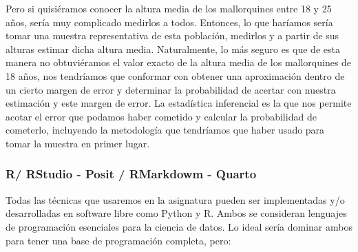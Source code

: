 \documentclass[
  letterpaper,
  DIV=11,
  numbers=noendperiod]{scrreprt}
\begin{document}
Pero si quisiéramos conocer la altura media de los mallorquines entre 18
y 25 años, sería muy complicado medirlos a todos. Entonces, lo que
haríamos sería tomar una muestra representativa de esta población,
medirlos y a partir de sus alturas estimar dicha altura media.
Naturalmente, lo más seguro es que de esta manera no obtuviéramos el
valor exacto de la altura media de los mallorquines de 18 años, nos
tendríamos que conformar con obtener una aproximación dentro de un
cierto margen de error y determinar la probabilidad de acertar con
nuestra estimación y este margen de error. La estadística inferencial es
la que nos permite acotar el error que podamos haber cometido y calcular
la probabilidad de cometerlo, incluyendo la metodología que tendríamos
que haber usado para tomar la muestra en primer lugar.

\hypertarget{r-rstudio---posit-rmarkdowm---quarto}{%
\subsubsection{R/ RStudio - Posit / RMarkdowm -
Quarto}\label{r-rstudio---posit-rmarkdowm---quarto}}

Todas las técnicas que usaremos en la asignatura pueden ser
implementadas y/o desarrolladas en software libre como Python y R. Ambos
se consideran lenguajes de programación esenciales para la ciencia de
datos. Lo ideal sería dominar ambos para tener una base de programación
completa, pero:
\end{document}
